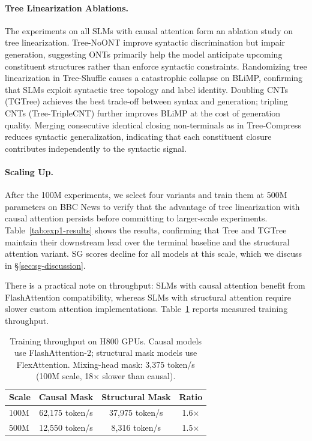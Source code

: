 \documentclass[11pt]{article}
\begin{document}
\paragraph{Tree Linearization Ablations. }
The experiments on all SLMs with causal attention form an ablation study on tree linearization.
Tree-NoONT improve syntactic discrimination but impair generation, suggesting ONTs primarily help the model anticipate upcoming constituent structures rather than enforce syntactic constraints. Randomizing tree linearization in Tree‑Shuffle causes a catastrophic collapse on BLiMP, confirming that SLMs exploit syntactic tree topology and label identity. Doubling CNTs (TGTree) achieves the best trade‑off between syntax and generation; tripling CNTs (Tree-TripleCNT) further improves BLiMP at the cost of generation quality. Merging consecutive identical closing non-terminals as in Tree‑Compress reduces syntactic generalization, indicating that each constituent closure contributes independently to the syntactic signal. 

\paragraph{Scaling Up.} After the 100M experiments, we select four variants and train them at 500M parameters on BBC News to verify that the advantage of tree linearization with causal attention persists before committing to larger-scale experiments.
Table~\ref{tab:exp1-results} shows the results, confirming that Tree and TGTree maintain their downstream lead over the terminal baseline and the structural attention variant.
SG scores decline for all models at this scale, which we discuss in \S\ref{sec:sg-discussion}.

There is a practical note on throughput: SLMs with causal attention benefit from FlashAttention compatibility, whereas SLMs with structural attention require slower custom attention implementations.
Table~\ref{tab:efficiency} reports measured training throughput.

\begin{table}[tbp]
  \centering
  \fontsize{10pt}{12pt}\selectfont
  \setlength{\tabcolsep}{6pt}
  \begin{tabular}{lccc}
    \toprule
    Scale & Causal Mask & Structural Mask & Ratio \\
    \midrule
    100M & 62,175 token/s & 37,975 token/s & 1.6$\times$ \\
    500M & 12,550 token/s & 8,316 token/s & 1.5$\times$ \\
    \bottomrule
  \end{tabular}
  \caption{Training throughput on H800 GPUs. Causal models use FlashAttention-2; structural mask models use FlexAttention. Mixing-head mask: 3,375 token/s (100M scale, 18$\times$ slower than causal).}
  \label{tab:efficiency}
\end{table}
\end{document}
